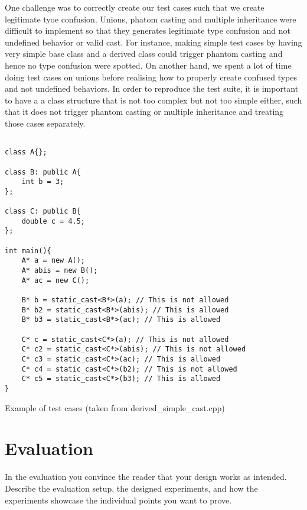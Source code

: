 \documentclass[a4paper,11pt,oneside]{report}
\begin{document}
\noindent{}One challenge was to correctly create our test cases such that we
create legitimate tyoe confusion.  Unions, phatom casting and multiple
inheritance were difficult to implement so that they generates legitimate type
confusion and not undefined behavior or valid cast. For instance, making simple
test cases by having very simple base class and a derived class could trigger
phantom casting and hence no type confusion were spotted. On another hand, we
spent a lot of time doing test cases on unions before realising how to properly
create confused types and not undefined behaviors.  In order to reproduce the
test suite, it is important to have a a class structure that is not too complex
but not too simple either, such that it does not trigger phantom casting or
multiple inheritance and treating those cases separately.

\begin{listing}
       \begin{verbatim}

class A{};

class B: public A{
    int b = 3;
};

class C: public B{
    double c = 4.5;
}; 

int main(){
    A* a = new A();
    A* abis = new B();
    A* ac = new C();

    B* b = static_cast<B*>(a); // This is not allowed
    B* b2 = static_cast<B*>(abis); // This is allowed
    B* b3 = static_cast<B*>(ac); // This is allowed

    C* c = static_cast<C*>(a); // This is not allowed
    C* c2 = static_cast<C*>(abis); // This is not allowed
    C* c3 = static_cast<C*>(ac); // This is allowed
    C* c4 = static_cast<C*>(b2); // This is not allowed
    C* c5 = static_cast<C*>(b3); // This is allowed
}
       \end{verbatim}
       \caption{Example of test cases (taken from derived\_simple\_cast.cpp)}
       \label{lst:test_cases}
\end{listing}

\chapter{Evaluation}

In the evaluation you convince the reader that your design works as intended.
Describe the evaluation setup, the designed experiments, and how the
experiments showcase the individual points you want to prove.
\end{document}
